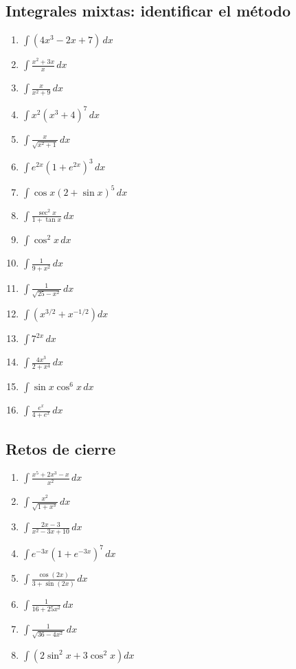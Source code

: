 \documentclass[12pt]{article}
\theoremstyle{definition}
\theoremstyle{remark}
\begin{document}
\subsection{Integrales mixtas: identificar el método}
\begin{enumerate}[label=\arabic*.,start=113]
\item $\displaystyle \int(4x^3-2x+7)\,dx$
\item $\displaystyle \int\frac{x^2+3x}{x}\,dx$
\item $\displaystyle \int\frac{x}{x^2+9}\,dx$
\item $\displaystyle \int x^2(x^3+4)^7\,dx$
\item $\displaystyle \int\frac{x}{\sqrt{x^2+1}}\,dx$
\item $\displaystyle \int e^{2x}(1+e^{2x})^3\,dx$
\item $\displaystyle \int\cos x(2+\sin x)^5\,dx$
\item $\displaystyle \int\frac{\sec^2x}{1+\tan x}\,dx$
\item $\displaystyle \int\cos^2x\,dx$
\item $\displaystyle \int\frac{1}{9+x^2}\,dx$
\item $\displaystyle \int\frac{1}{\sqrt{25-x^2}}\,dx$
\item $\displaystyle \int\left(x^{3/2}+x^{-1/2}\right)dx$
\item $\displaystyle \int 7^{2x}\,dx$
\item $\displaystyle \int\frac{4x^3}{2+x^4}\,dx$
\item $\displaystyle \int\sin x\cos^6x\,dx$
\item $\displaystyle \int\frac{e^x}{4+e^x}\,dx$
\end{enumerate}

\subsection{Retos de cierre}
\begin{enumerate}[label=\arabic*.,start=129]
\item $\displaystyle \int\frac{x^5+2x^3-x}{x^2}\,dx$
\item $\displaystyle \int\frac{x^2}{\sqrt{1+x^3}}\,dx$
\item $\displaystyle \int\frac{2x-3}{x^2-3x+10}\,dx$
\item $\displaystyle \int e^{-3x}(1+e^{-3x})^7\,dx$
\item $\displaystyle \int\frac{\cos(2x)}{3+\sin(2x)}\,dx$
\item $\displaystyle \int\frac{1}{16+25x^2}\,dx$
\item $\displaystyle \int\frac{1}{\sqrt{36-4x^2}}\,dx$
\item $\displaystyle \int\left(2\sin^2x+3\cos^2x\right)dx$
\end{enumerate}
\end{document}

